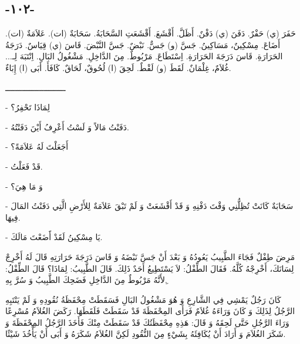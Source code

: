 \documentclass[a5paper]{article}
\begin{document}
\subsection[-١٠٢-]{-١٠٢-}
حَفَرَ (ي) حَفْرٌ. دَفَنَ (ي) دَفْنٌ. أَظَلَّ. أَقْشَعَ. أَقْشَعَتِ السَّحَابَةُ. سَحَابَةٌ (ات). عَلاَمَةٌ (ات). أَضَاعَ. مِسْكِينٌ، مَسَاكِينُ. جَسَّ (و) جَسٌّ. نَبْضٌ. جَسَّ النَّبْضَ. قَاسَ (ي) قِيَاسٌ. دَرَجَةُ الحَرَارَةِ. قَاسَ دَرَجَةَ الحَرَارَةِ. اِسْتَطَاعَ. مَرْبُوطٌ. مِنَ الدَّاخِلِ. مَشْغُولُ البَالِ. اِنْتَبَهَ لِـ... غُلاَمٌ، غِلْمَانٌ. لَقَطَ (و) لَقْطٌ. لَحِقَ (ا) لُحُوقٌ، لََحَاقٌ. كَافَأَ. أَبَى (ا) إِبَاءٌ.

ـــــــــــــــــــــــــ

- لِمَاذَا تَحْفِرُ؟

- دَفَنْتُ مَالاً وَ لَسْتُ أَعْرِفُ أَيْنَ دَفَنْتُهُ.

- أَجَعَلْتَ لَهُ عَلاَمَةً؟

- قَدْ فَعَلْتُ.

- وَ مَا هِيَ؟

- سَحَابَةٌ كَانَتْ تُظِلُّنِي وَقْتَ دَفْنِهِ وَ قَدْ أَقْشَعَتْ وَ لَمْ تَبْقَ عَلاَمَةٌ لِلأَرْضِ الَّتِي دَفَنْتُ المَالَ فِيهَا.

- يَا مِسْكِينُ لَقَدْ أََضَعْتَ مَالَكَ.

مَرِضَ طِفْلٌ فَجَاءَ الطَّبِيبُ يَعُودُهُ وَ بَعْدَ أَنْ جَسَّ نَبْضَهُ وَ قَاسَ دَرَجَةَ حَرَارَتِهِ قَالَ لَهُ أَخْرِجْ لِسَانَكَ، أَخْرِجْهُ كُلَّهُ. فَقَالَ الطِّفْلُ: لاَ يَسْتَطِيعُ أَحَدٌ ذَلِكَ. قَالَ الطَّبِيبُ: لِمَاذَا؟ قَالَ الطِّفْلُ: ِلأَنَّهُ مَرْبُوطٌ مِنَ الدَّاخِلِ فَضَحِكَ الطَّبِيبُ وَ سُرَّ بِهِ. 

كَانَ رَجُلٌ يَمْشِي فِي الشَّارِعِ وَ هُوَ مَشْغُولُ البَالِ فَسَقَطَتْ مِحْفَظَةُ نُقُودِهِ وَ لَمْ يَنْتَبِهِ الرَّجُلُ لِذَلِكَ وَ كَانَ وَرَاءَهُ غُلاَمٌ فَرَأَى المِحْفَظَةَ قَدْ سَقَطَتْ فَلَقَطَهَا. رَكَضَ الغُلاَمُ مُسْرِعًا وَرَاءَ الرَّجُلِ حَتَّى لَحِقَهُ وَ قَالَ: هَذِهِ مِحْفَظَتُكَ قَدْ سَقَطَتْ مِنْكَ فَأَخَذَ الرَّجُلُ المِحْفَظَةَ وَ شَكَرَ الغُلاَمَ وَ أَرَادَ أَنْ يُكَافِئَهُ بِشَيْءٍ مِنَ النُّقُودِ لَكِنَّ الغُلاَمُ شَكَرَهُ وَ أَبَى أَنْ يَأْخُذَ شَيْئًا.
\end{document}
